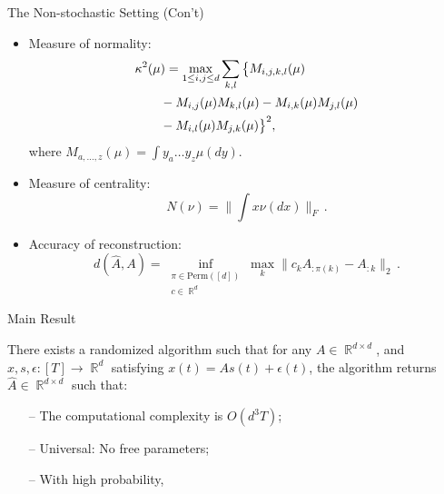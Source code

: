 \documentclass[final]{beamer} %
\newcommand{\eps}{\epsilon}
\DeclareMathOperator{\real}{\mathbb{R}}
\begin{document}
\begin{frame}[c]
\begin{columns}[t,totalwidth=\textwidth]
	\begin{column}{.32\textwidth}%
		\begin{block}{The Non-stochastic Setting (Con't)}
			\begin{itemize}
				\item Measure of normality:
					\begin{align*}
							\MoveEqLeft \kappa^2(\mu)  =   \max_{1\le i,j\le d} \sum_{k,l} 
							\big\{ 
							M_{i,j,k,l}(\mu) \\
							& - M_{i,j}(\mu) M_{k,l}(\mu) -  M_{i,k}(\mu) M_{j,l}(\mu) \\
							& - M_{i,l}(\mu) M_{j,k}(\mu)\big\}^2,
					\end{align*}
					where $M_{a,\dots,z}(\mu) = \int y_a \dots y_z \mu(dy)$.
				\item Measure of centrality: 
					\[
				 	N(\nu) = \bigl\|\textstyle\int x \nu(dx) \bigr\|_F\,.
					\]
					\vspace*{-1.0cm}
				\item Accuracy of reconstruction:
					\[
					d(\hat{A},A) = \inf_{
						 \substack{\pi \in \mathrm{Perm}([d])\\
						 c\in \real^d}} \max_{k} 
						\| c_k A_{:\pi(k)} - A_{:k} \|_2\,.
					\]
			\end{itemize}
		\end{block}
		\bigskip
		\bigskip
		\medskip
		\begin{block}{Main Result}
		\begin{center}
				\begin{tcolorbox}[title = \vspace{0.4cm}\textbf{\large Main Result} \vspace{0.4cm}, title filled, width = 0.95\textwidth, colback = uofagreen!10, colframe = red]
						\vspace{0.5cm}
						There exists a randomized algorithm such that 
						for any $A\in \real^{d\times d}$, and $x, s, \eps: [T] \rightarrow \real^d$ satisfying $x(t) = As(t)+\eps(t)$,
						the algorithm returns $\hat{A}\in \real^{d \times d}$ such that:
							\begin{itemize}
								\item[--] The computational complexity is $O(d^3 T)$;
								\item[--] Universal: No free parameters;
								\item[--] With high probability, 
									\vspace*{0.2cm}

\end{itemize}
\end{tcolorbox}
\end{center}
\end{block}
\end{column}
\end{columns}
\end{frame}
\end{document}
